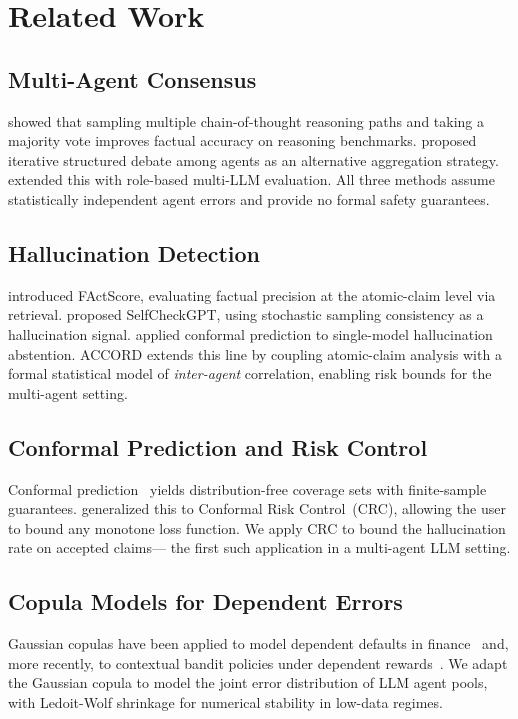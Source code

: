 \documentclass[conference]{IEEEtran}
\begin{document}
\section{Related Work}
\label{sec:related}

\subsection{Multi-Agent Consensus}
\citet{wang2022selfconsistency} showed that sampling multiple
chain-of-thought reasoning paths and taking a majority vote
improves factual accuracy on reasoning benchmarks.
\citet{du2023debate} proposed iterative structured debate among
agents as an alternative aggregation strategy.
\citet{chan2023chateval} extended this with role-based
multi-LLM evaluation.
All three methods assume statistically independent agent errors
and provide no formal safety guarantees.

\subsection{Hallucination Detection}
\citet{min2023factscore} introduced FActScore, evaluating
factual precision at the atomic-claim level via retrieval.
\citet{manakul2023selfcheckgpt} proposed SelfCheckGPT, using
stochastic sampling consistency as a hallucination signal.
\citet{abbasi2024conformal} applied conformal prediction to
single-model hallucination abstention.
ACCORD extends this line by coupling atomic-claim analysis with
a formal statistical model of \emph{inter-agent} correlation,
enabling risk bounds for the multi-agent setting.

\subsection{Conformal Prediction and Risk Control}
Conformal prediction~\cite{vovk2005} yields distribution-free
coverage sets with finite-sample guarantees.
\citet{angelopoulos2022crc} generalized this to Conformal Risk
Control~(CRC), allowing the user to bound any monotone loss
function.
We apply CRC to bound the hallucination rate on accepted claims—
the first such application in a multi-agent LLM setting.

\subsection{Copula Models for Dependent Errors}
Gaussian copulas have been applied to model dependent defaults
in finance~\cite{li2000defaultcorrelation} and, more recently,
to contextual bandit policies under dependent
rewards~\cite{kim2025copulabandits}.
We adapt the Gaussian copula to model the joint error
distribution of LLM agent pools, with Ledoit-Wolf shrinkage
for numerical stability in low-data regimes.
\end{document}
